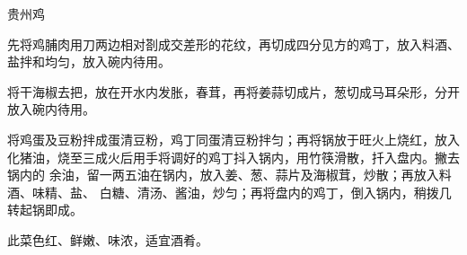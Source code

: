\begin{recipe}{贵州鸡}

\ingredients


\preparation

\step 先将鸡脯肉用刀两边相对剳成交差形的花纹，再切成四分见方的鸡丁，放入料酒、
盐拌和均匀，放入碗内待用。

\step 将干海椒去把，放在开水内发胀，春茸，再将姜蒜切成片，葱切成马耳朵形，分开
放入碗内待用。

\step 将鸡蛋及豆粉拌成蛋清豆粉，鸡丁同蛋清豆粉拌匀；再将锅放于旺火上烧红，放入
化猪油，烧至三成火后用手将调好的鸡丁抖入锅内，用竹筷滑散，扦入盘内。撇去锅内的
余油，留一两五油在锅内，放入姜、葱、蒜片及海椒茸，炒散；再放入料酒、味精、盐、
白糖、清汤、酱油，炒匀；再将盘内的鸡丁，倒入锅内，稍拨几转起锅即成。

\features

此菜色红、鲜嫩、味浓，适宜酒肴。

\end{recipe}


